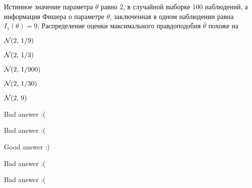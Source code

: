 
\begin{question}
Истинное значение параметра \(\theta\) равно \(2\), в случайной выборке
100 наблюдений, а информация Фишера о параметре \(\theta\), заключенная
в одном наблюдении равна \(I_1(\theta) = 9\). Распределение оценки
максимального правдоподобия \(\hat{\theta}\) похоже на
\begin{answerlist}
  \item \(\mathcal{N}(2, \, 1/9)\)
  \item \(\mathcal{N}(2, \, 1/3)\)
  \item \(\mathcal{N}(2, \, 1/900)\)
  \item \(\mathcal{N}(2, \, 1/30)\)
  \item \(\mathcal{N}(2, \, 9)\)
\end{answerlist}
\end{question}

\begin{solution}
\begin{answerlist}
  \item Bad answer :(
  \item Bad answer :(
  \item Good answer :)
  \item Bad answer :(
  \item Bad answer :(
\end{answerlist}
\end{solution}

